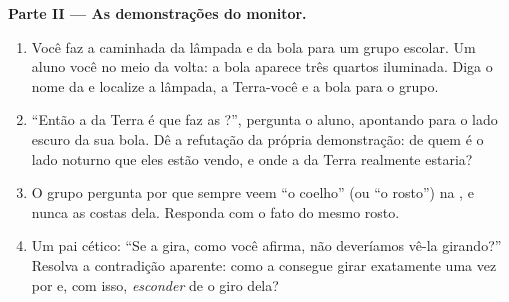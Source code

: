 \begin{problem}
\medskip\noindent\textbf{Parte II --- As demonstrações do monitor.}
\begin{enumerate}[resume]
  \item Você faz a caminhada da lâmpada e da bola para um grupo
        escolar. Um aluno  você no meio da volta: a bola
        aparece três quartos iluminada. Diga o nome da  e
        localize a lâmpada, a Terra-você e a bola para o grupo.
  \item ``Então a  da Terra é que faz as ?'', pergunta o
        aluno, apontando para o lado escuro da sua bola. Dê a
        refutação da própria demonstração: de quem é o lado noturno
        que eles estão vendo, e onde a  da Terra realmente
        estaria?
  \item O grupo pergunta por que sempre veem ``o coelho'' (ou ``o
        rosto'') na , e nunca as costas dela. Responda com o fato
        do mesmo rosto.
  \item Um pai cético: ``Se a  gira, como você afirma, não
        deveríamos vê-la girando?'' Resolva a contradição aparente:
        como a  consegue girar exatamente uma vez por  e,
        com isso, \emph{esconder} de  o giro dela?
\end{enumerate}


\end{problem}
